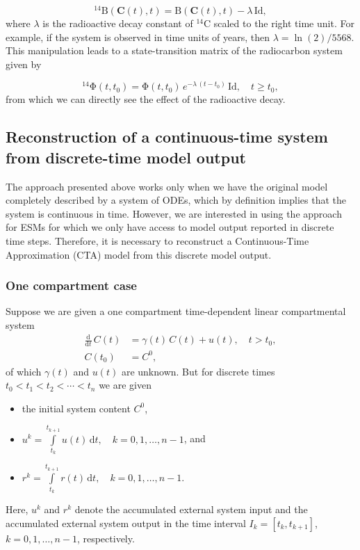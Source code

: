 \documentclass[11pt,a4paper]{article}
\renewcommand{\vec}[1]{\mathbf{#1}}
\newcommand{\tens}[1]{\mathrm{#1}}
\newcommand{\id}{\tens{Id}}
\newcommand{\deriv}[1]{\frac{\mathrm{d}}{\mathrm{d}#1}}
\newcommand{\dd}[1]{\,\mathrm{d}#1}
\newcommand{\intl}{\int\limits}
\begin{document}
    \begin{equation*}
        {}^{14}\tens{B}(\vec{C}(t),t) = \tens{B}(\vec{C}(t),t) - \lambda\,\id,
    \end{equation*}
    where $\lambda$ is the radioactive decay constant of ${}^{14}$C scaled to the right time unit.
    For example, if the system is observed in time units of years, then $\lambda=\ln(2)/5568$.
    This manipulation leads to a state-transition matrix of the radiocarbon system given by
    
    \begin{equation*}
        {}^{14}\tens{\Phi}(t,t_0) = \tens{\Phi}(t,t_0)\, e^{-\lambda\,(t-t_0)}\,\id, \quad t\geq t_0,
    \end{equation*}
    from which we can directly see the effect of the radioactive decay.


\subsection{Reconstruction of a continuous-time system from discrete-time model output}
The approach presented above works only when we have the original model completely described by a system of ODEs, which by definition implies that the system is continuous in time. However, we are interested in using the approach for ESMs for which we only have access to model output reported in discrete time steps. Therefore, it is necessary to reconstruct a Continuous-Time Approximation (CTA) model from this discrete model output. 
    
    \subsubsection*{One compartment case}
        Suppose we are given a one compartment time-dependent linear compartmental system
        \begin{equation}\label{eqn:CS_one_dim}
            \begin{aligned}
                \deriv{t}\,C(t) &= \gamma(t)\,C(t) + u(t),\quad t>t_0,\\
                C(t_0) &= C^0,
            \end{aligned}
        \end{equation}
        of which $\gamma(t)$ and $u(t)$ are unknown.
        But for discrete times $t_0<t_1<t_2<\cdots<t_n$ we are given
        \begin{itemize}
            \item the initial system content $C^0$,
            \item $u^k = \intl_{t_k}^{t_{k+1}} u(t)\dd{t},\quad k=0,1,\ldots,n-1$, and
            \item $r^k = \intl_{t_k}^{t_{k+1}} r(t)\dd{t},\quad k=0,1,\ldots,n-1$.
        \end{itemize}
        Here, $u^k$ and $r^k$ denote the accumulated external system input and the accumulated external system output in the time interval $I_k=[t_k,t_{k+1}]$, $k=0,1,\ldots,n-1$, respectively.
\end{document}

